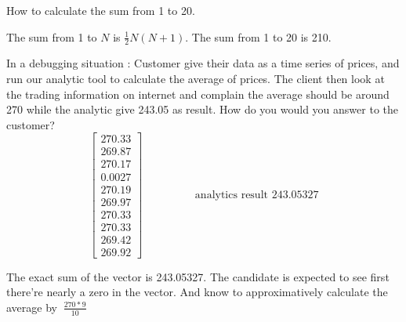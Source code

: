 \documentclass[answers]{exam}
\begin{document}
\begin{questions}
\question How to calculate the sum from 1 to 20.
\begin{solution}[.2in]
	The sum from 1 to $N$ is $\frac{1}{2}N(N+1)$. The sum from 1 to 20 is 210.
\end{solution}

\question In a debugging situation : Customer give their data as a time series of prices, and run our analytic tool to calculate the average of prices. The client then look at the trading information on internet and complain the average should be around 270 while the analytic give 243.05 as result. How do you would you answer to the customer? 
\[
\left[ 
\begin{array}{c}
270.33 \\
269.87 \\
270.17 \\
0.0027 \\
270.19 \\
269.97 \\
270.33 \\
270.33 \\
269.42 \\
269.92
\end{array}
\right]
\hspace{2cm}
\text{analytics result 243.05327}
\]
\begin{solution}[.2in]
	The exact sum of the vector is 243.05327. The candidate is expected to see first there're nearly a zero in the vector. And know to approximatively calculate the average by $~ \frac{270*9}{10}$
\end{solution}


\end{questions}
\end{document}
